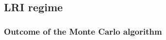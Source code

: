 \documentclass[12pt, titlepage]{report}
\begin{document}
%

\subsection{LRI regime}
\subsubsection{Outcome of the Monte Carlo algorithm}
\end{document}
